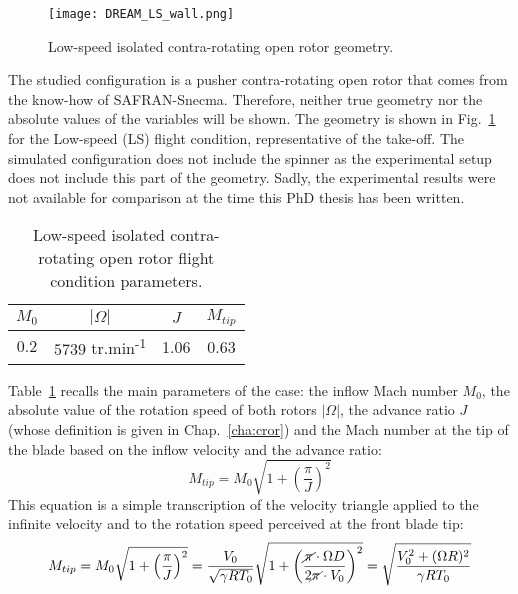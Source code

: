 

\begin{figure}[htb]
  \centering
  \texttt{[image: DREAM\_LS\_wall.png]}
  \caption{Low-speed isolated contra-rotating open rotor geometry.}
  \label{fig:dream_ls_wall}
\end{figure}

The studied configuration is a pusher contra-rotating open rotor
that comes from the know-how of SAFRAN-Snecma. Therefore,
neither true geometry nor the absolute values of the variables
will be shown.
The geometry is shown in Fig.~\ref{fig:dream_ls_wall} for the
Low-speed (LS) flight condition, representative of the take-off. 
The simulated configuration does not include the spinner as the
experimental setup does not include this part of the geometry.
Sadly, the experimental results were not available for comparison
at the time this PhD thesis has been written.

\begin{table}[htb]
   \centering
  \begin{tabular}{cccc}
    \toprule
    $M_0$ & $|\Omega|$ & $J$ & $M_{tip}$ \\
    \midrule
    $0.2$ & $5739$ tr.min\textsuperscript{-1} & 1.06 & 0.63 \\
    \bottomrule
  \end{tabular}
  \caption{Low-speed isolated contra-rotating open rotor flight condition parameters.}
  \label{tab:dream_ls_flight_condition}
\end{table} 
Table~\ref{tab:dream_ls_flight_condition} recalls the main
parameters of the case: the inflow Mach number $M_0$,
the absolute value of the rotation speed of both rotors $|\Omega|$,
the advance ratio $J$ (whose definition is given in Chap.~\ref{cha:cror})
and the Mach number at the tip of
the blade based on the inflow velocity and the advance ratio:
\begin{equation}
	M_{tip} = M_0 \sqrt{1 + \left(\frac{\pi}{J} \right)^2}
\end{equation}
This equation is a simple transcription of the velocity triangle
applied to the infinite velocity and to the rotation speed perceived
at the front blade tip:
\begin{equation}
    M_{tip} = M_0 \sqrt{1 + \left(\frac{\pi}{J}\right)^2} = 
    \frac{V_0}{\sqrt{\gamma R T_0}} \sqrt{1 + \left(\frac{
    	\cancel{\pi} \cdot \Omega D}{
    	2 \cancel{\pi} \cdot V_0}\right)^2} =
    \sqrt{\frac{V_0^2 + (\Omega R)^2}{\gamma R T_0}}
    \label{eq:m_tip_explained}
\end{equation}

